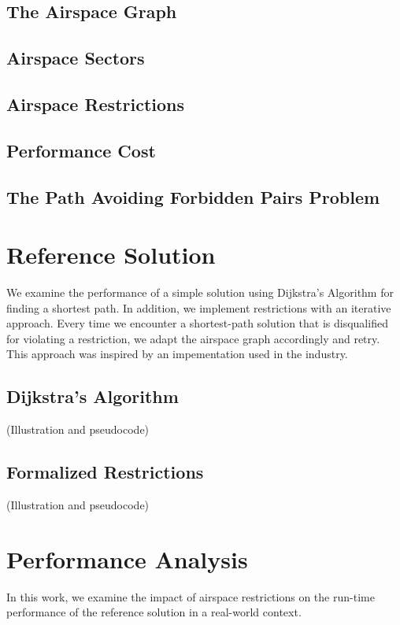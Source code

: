 \documentclass{article}
\begin{document}
\subsection{The Airspace Graph}

\subsection{Airspace Sectors}

\subsection{Airspace Restrictions}

\subsection{Performance Cost}

\subsection{The Path Avoiding Forbidden Pairs Problem}

\section{Reference Solution}
We examine the performance of a simple solution using Dijkstra's Algorithm for finding a shortest path.
In addition, we implement restrictions with an iterative approach. Every time we encounter a shortest-path solution that is disqualified for violating a restriction, we adapt the airspace graph accordingly and retry.
This approach was inspired by an impementation used in the industry.

\subsection{Dijkstra's Algorithm}

(Illustration and pseudocode)

\subsection{Formalized Restrictions}

(Illustration and pseudocode)


\section{Performance Analysis}
In this work, we examine the impact of airspace restrictions on the run-time performance of the reference solution in a real-world context.
\end{document}

